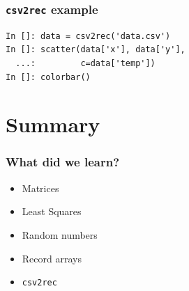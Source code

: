 \documentclass[14pt,compress]{beamer}
\newcounter{time}
\newcommand{\inctime}[1]{\addtocounter{time}{#1}{\tiny \thetime\ m}}
\newcommand{\typ}[1]{\lstinline{#1}}
\begin{document}
\begin{frame}[fragile]
    \frametitle{\typ{csv2rec} example}
    \begin{lstlisting}
In []: data = csv2rec('data.csv')
In []: scatter(data['x'], data['y'], 
  ...:         c=data['temp'])
In []: colorbar()
    \end{lstlisting}
\end{frame}

\section{Summary}
\begin{frame}
  \frametitle{What did we learn?}
  \begin{itemize}
  \item Matrices
  \item Least Squares
  \item Random numbers
  \item Record arrays
  \item \typ{csv2rec}
  \end{itemize}
  \inctime{5}
\end{frame}
\end{document}
